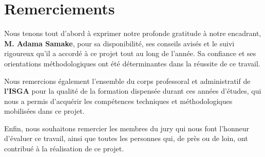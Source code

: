 \chapter*{Remerciements}

Nous tenons tout d'abord à exprimer notre profonde gratitude à notre encadrant,
\textbf{M. Adama Samake}, pour sa disponibilité, ses conseils avisés et le suivi
rigoureux qu'il a accordé à ce projet tout au long de l'année. Sa
confiance et ses orientations méthodologiques ont été déterminantes dans la
réussite de ce travail.

Nous remercions également l'ensemble du corps professoral et administratif de
\textbf{l'ISGA} pour la qualité de la formation dispensée durant ces années
d'études, qui nous a permis d'acquérir les compétences techniques et
méthodologiques mobilisées dans ce projet.

Enfin, nous souhaitons remercier les membres du jury qui nous font l'honneur
d'évaluer ce travail, ainsi que toutes les personnes qui, de près ou de loin,
ont contribué à la réalisation de ce projet.
